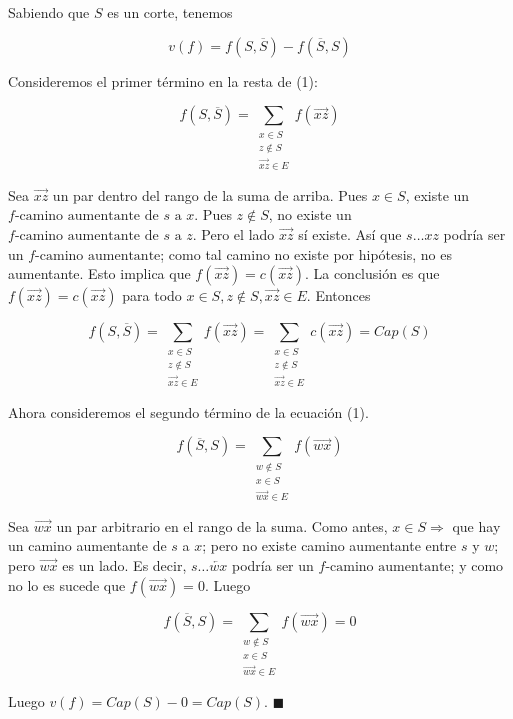 \documentclass[11pt, a4paper]{article}
\theoremstyle{definition}
\begin{document}
\begin{enumerate}
\begin{itemize}
            Sabiendo que \( S \) es un corte, tenemos
            
            \[ v(f) = f(S, \overline{S}) - f(\overline{S}, S) \tag{1} \]
            
            Consideremos el primer término en la resta de (1):
            
            \[ f(S, \overline{S}) = \sum_{\substack{x \in S \\ z \notin S \\ \overrightarrow{xz} \in E}} f(\overrightarrow{xz}) \]
            
            Sea \(\overrightarrow{xz}\) un par dentro del rango de la suma de arriba. 
            Pues \( x \in S \), existe un \( f\text{-camino aumentante de } s \text{ a } x \). 
            Pues \( z \notin S \), no existe un \( f\text{-camino aumentante de } s \text{ a } z \). 
            Pero el lado \(\overrightarrow{xz}\) sí existe. Así que \( s \ldots xz \) podría ser un \( f\text{-camino aumentante} \); 
            como tal camino no existe por hipótesis, no es aumentante. 
            Esto implica que \( f(\overrightarrow{xz}) = c(\overrightarrow{xz}) \). 
            La conclusión es que \( f(\overrightarrow{xz}) = c(\overrightarrow{xz}) \) para todo \( x \in S, z \notin S, \overrightarrow{xz} \in E \). 
            Entonces

            \[ f(S, \overline{S}) = \sum_{\substack{x \in S \\ z \notin S \\ \overrightarrow{xz} \in E}} f(\overrightarrow{xz}) = \sum_{\substack{x \in S \\ z \notin S \\ \overrightarrow{xz} \in E}} c(\overrightarrow{xz}) = Cap(S) \]

            Ahora consideremos el segundo término de la ecuación (1).

            \[ f(\overline{S}, S) = \sum_{\substack{w \notin S \\ x \in S \\ \overrightarrow{wx} \in E}} f(\overrightarrow{wx}) \]

            Sea \(\overrightarrow{wx}\) un par arbitrario en el rango de la suma. Como antes, \( x \in S \Rightarrow \) que hay un camino aumentante de \( s \) a \( x \); pero no existe camino aumentante entre \( s \) y \( w \); pero \(\overrightarrow{wx}\) es un lado. Es decir, \( s \ldots \overleftarrow{wx} \) podría ser un \( f\text{-camino aumentante}\); y como no lo es sucede que \( f(\overrightarrow{wx}) = 0 \). Luego

            \[ f(\overline{S}, S) = \sum_{\substack{w \notin S \\ x \in S \\ \overrightarrow{wx} \in E}} f(\overrightarrow{wx}) = 0 \]

            Luego \( v(f) = Cap(S) - 0 = Cap(S) \). \(\blacksquare\)
        \end{itemize}

    \end{enumerate}
\end{document}

